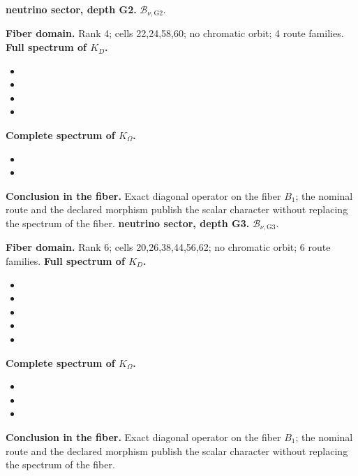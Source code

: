\medskip
{}
\noindent\textbf{neutrino sector, depth G2.} \(\mathcal B_{\nu,\mathrm{G2}}\).\par
\noindent\textbf{Fiber domain.} Rank 4; cells 22,24,58,60; no chromatic orbit; 4 route families.
\noindent\textbf{Full spectrum of \(K_D\).}
\begin{itemize}
\item \texttt{}
\item \texttt{}
\item \texttt{}
\item \texttt{}
\end{itemize}
\noindent\textbf{Complete spectrum of \(K_\Omega\).}
\begin{itemize}
\item \texttt{}
\item \texttt{}
\end{itemize}
\noindent\textbf{Conclusion in the fiber.} Exact diagonal operator on the fiber \(B_1\); the nominal route and the declared morphism publish the scalar character without replacing the spectrum of the fiber.
\medskip
{}
\noindent\textbf{neutrino sector, depth G3.} \(\mathcal B_{\nu,\mathrm{G3}}\).\par
\noindent\textbf{Fiber domain.} Rank 6; cells 20,26,38,44,56,62; no chromatic orbit; 6 route families.
\noindent\textbf{Full spectrum of \(K_D\).}
\begin{itemize}
\item \texttt{}
\item \texttt{}
\item \texttt{}
\item \texttt{}
\item \texttt{}
\end{itemize}
\noindent\textbf{Complete spectrum of \(K_\Omega\).}
\begin{itemize}
\item \texttt{}
\item \texttt{}
\item \texttt{}
\end{itemize}
\noindent\textbf{Conclusion in the fiber.} Exact diagonal operator on the fiber \(B_1\); the nominal route and the declared morphism publish the scalar character without replacing the spectrum of the fiber.
